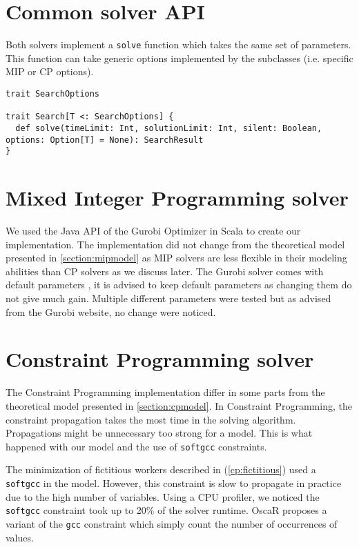 \documentclass[../thesis.tex]{subfiles}
\begin{document}
\section{Common solver API}

Both solvers implement a \texttt{solve} function which takes the same set of parameters.
This function can take generic options implemented by the subclasses (i.e. specific MIP or CP options).

\begin{lstlisting}[style=scalaStyle,caption={Solver API},captionpos=b]
trait SearchOptions

trait Search[T <: SearchOptions] {
  def solve(timeLimit: Int, solutionLimit: Int, silent: Boolean, options: Option[T] = None): SearchResult
}
\end{lstlisting}

\section{Mixed Integer Programming solver}

We used the Java API \cite{gurobi:java} of the Gurobi Optimizer in Scala to create our implementation. 
The implementation did not change from the theoretical model presented in \autoref{section:mipmodel} as 
MIP solvers are less flexible in their modeling abilities than CP solvers as we discuss later. The Gurobi solver 
comes with default parameters \cite{gurobi:parameters}, it is advised to keep default parameters as 
changing them do not give much gain. Multiple different parameters were tested but as advised from the Gurobi website, 
no change were noticed.

\section{Constraint Programming solver}

The Constraint Programming implementation differ in some parts from the theoretical model 
presented in \autoref{section:cpmodel}. In Constraint Programming, the constraint propagation 
takes the most time in the solving algorithm. Propagations might be unnecessary too strong for a model.
This is what happened with our model and the use of \texttt{softgcc} constraints. 

The minimization of fictitious workers described in (\ref{cp:fictitious}) used a \texttt{softgcc} in the model.
However, this constraint is slow to propagate in practice due to the high number of variables.
Using a CPU profiler, we noticed the \texttt{softgcc} constraint took up to 20\% of the solver runtime. 
OscaR proposes a variant of the \texttt{gcc} constraint which simply count the number of occurrences of values.
\end{document}
